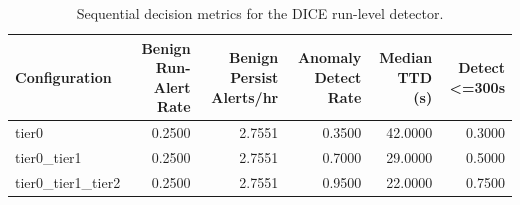 \begin{table}[t]
\centering
\caption{Sequential decision metrics for the DICE run-level detector.}
\label{tab:dice_sequential_metrics}
\footnotesize
\begin{tabular}{lrrrrr}
\toprule
Configuration & Benign Run-Alert Rate & Benign Persist Alerts/hr & Anomaly Detect Rate & Median TTD (s) & Detect <=300s \\
\midrule
tier0 & 0.2500 & 2.7551 & 0.3500 & 42.0000 & 0.3000 \\
tier0_tier1 & 0.2500 & 2.7551 & 0.7000 & 29.0000 & 0.5000 \\
tier0_tier1_tier2 & 0.2500 & 2.7551 & 0.9500 & 22.0000 & 0.7500 \\
\bottomrule
\end{tabular}

\end{table}
